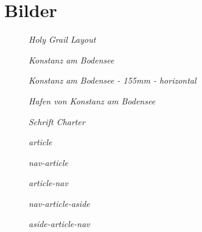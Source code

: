\documentclass[12pt,a4paper,twosides,ngerman]{scrbook}
\begin{document}
\section{Bilder}

\begin{figure}[htbp]
\epsfysize=3.0in
\centerline{}
\caption{\em Holy Grail Layout}\label{fig1}
\end{figure}


 
\begin{figure}[htbp]
\epsfysize=3.0in
\centerline{}
\caption{\em Konstanz am Bodensee}\label{fig1}
\end{figure}

\begin{figure}[htbp]
\epsfxsize=155mm
\centerline{}
\caption{\em Konstanz am Bodensee - 155mm - horizontal}\label{fig1}
\end{figure}

\begin{figure}[htbp]
\epsfxsize=155mm
\centerline{}
\caption{\em Hafen von Konstanz am Bodensee}\label{fig1}
\end{figure}

\begin{figure}[htbp]
\epsfxsize=155mm
\centerline{}
\caption{\em Schrift Charter}\label{fig1}
\end{figure}


\begin{figure}[htbp]
\epsfysize=3.0in
\centerline{}
\caption{\em article}\label{fig1}
\end{figure}

\begin{figure}[htbp]
\epsfysize=3.0in
\centerline{}
\caption{\em nav-article}\label{fig1}
\end{figure}

\begin{figure}[htbp]
\epsfysize=3.0in
\centerline{}
\caption{\em article-nav}\label{fig1}
\end{figure}

\begin{figure}[htbp]
\epsfysize=3.0in
\centerline{}
\caption{\em nav-article-aside}\label{fig1}
\end{figure}

\begin{figure}[htbp]
\epsfysize=3.0in
\centerline{}
\caption{\em aside-article-nav}\label{fig1}
\end{figure}
 
\end{document}
